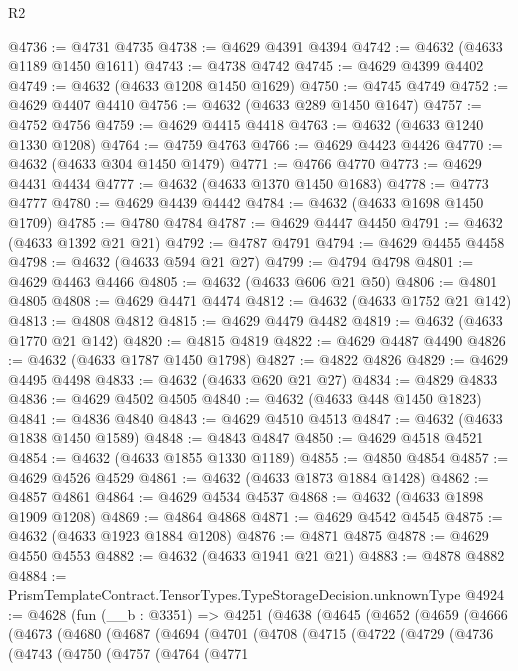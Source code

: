 \begin{lexlean}{R2}
\begin{coremodule}
@4736 := @4731 @4735
@4738 := @4629 @4391 @4394
@4742 := @4632 (@4633 @1189 @1450 @1611)
@4743 := @4738 @4742
@4745 := @4629 @4399 @4402
@4749 := @4632 (@4633 @1208 @1450 @1629)
@4750 := @4745 @4749
@4752 := @4629 @4407 @4410
@4756 := @4632 (@4633 @289 @1450 @1647)
@4757 := @4752 @4756
@4759 := @4629 @4415 @4418
@4763 := @4632 (@4633 @1240 @1330 @1208)
@4764 := @4759 @4763
@4766 := @4629 @4423 @4426
@4770 := @4632 (@4633 @304 @1450 @1479)
@4771 := @4766 @4770
@4773 := @4629 @4431 @4434
@4777 := @4632 (@4633 @1370 @1450 @1683)
@4778 := @4773 @4777
@4780 := @4629 @4439 @4442
@4784 := @4632 (@4633 @1698 @1450 @1709)
@4785 := @4780 @4784
@4787 := @4629 @4447 @4450
@4791 := @4632 (@4633 @1392 @21 @21)
@4792 := @4787 @4791
@4794 := @4629 @4455 @4458
@4798 := @4632 (@4633 @594 @21 @27)
@4799 := @4794 @4798
@4801 := @4629 @4463 @4466
@4805 := @4632 (@4633 @606 @21 @50)
@4806 := @4801 @4805
@4808 := @4629 @4471 @4474
@4812 := @4632 (@4633 @1752 @21 @142)
@4813 := @4808 @4812
@4815 := @4629 @4479 @4482
@4819 := @4632 (@4633 @1770 @21 @142)
@4820 := @4815 @4819
@4822 := @4629 @4487 @4490
@4826 := @4632 (@4633 @1787 @1450 @1798)
@4827 := @4822 @4826
@4829 := @4629 @4495 @4498
@4833 := @4632 (@4633 @620 @21 @27)
@4834 := @4829 @4833
@4836 := @4629 @4502 @4505
@4840 := @4632 (@4633 @448 @1450 @1823)
@4841 := @4836 @4840
@4843 := @4629 @4510 @4513
@4847 := @4632 (@4633 @1838 @1450 @1589)
@4848 := @4843 @4847
@4850 := @4629 @4518 @4521
@4854 := @4632 (@4633 @1855 @1330 @1189)
@4855 := @4850 @4854
@4857 := @4629 @4526 @4529
@4861 := @4632 (@4633 @1873 @1884 @1428)
@4862 := @4857 @4861
@4864 := @4629 @4534 @4537
@4868 := @4632 (@4633 @1898 @1909 @1208)
@4869 := @4864 @4868
@4871 := @4629 @4542 @4545
@4875 := @4632 (@4633 @1923 @1884 @1208)
@4876 := @4871 @4875
@4878 := @4629 @4550 @4553
@4882 := @4632 (@4633 @1941 @21 @21)
@4883 := @4878 @4882
@4884 := PrismTemplateContract.TensorTypes.TypeStorageDecision.unknownType
@4924 := @4628
    (fun (__b : @3351) =>
    @4251
      (@4638
        (@4645
          (@4652
            (@4659
              (@4666
                (@4673
                  (@4680
                    (@4687
                      (@4694
                        (@4701
                          (@4708
                            (@4715
                              (@4722
                                (@4729
                                  (@4736
                                    (@4743
                                      (@4750
                                        (@4757
                                          (@4764
                                            (@4771

\end{coremodule}
\end{lexlean}
